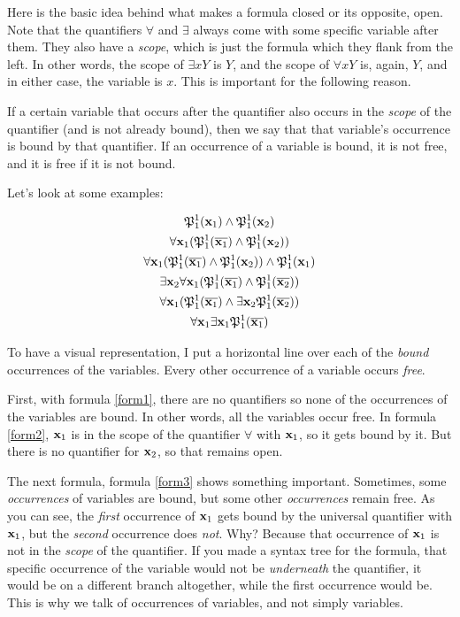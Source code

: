 Here is the basic idea behind what makes a formula closed or its opposite, open. Note that the quantifiers $\forall$ and $\exists$ always come with some specific variable after them. They also have a \textit{scope}, which is just the formula which they flank from the left. In other words, the scope of $\exists x Y$ is $Y$, and the scope of $\forall x Y$ is, again, $Y$, and in either case, the variable is $x$. This is important for the following reason. 

If a certain variable that occurs after the quantifier also occurs in the \textit{scope} of the quantifier (and is not already bound), then we say that that variable's occurrence is bound by that  quantifier. If an occurrence of a variable is bound, it is not free, and it is free if it is not bound. 

Let's look at some examples:

\begin{gather}
	\mathfrak{P}^{1}_{1}(\mathbf{x}_{1}) \wedge \mathfrak{P}^{1}_{1}(\mathbf{x}_{2})\label{form1}\\
	\forall \mathbf{x}_{1} (\mathfrak{P}^{1}_{1}(\overline{\mathbf{x}_{1}}) \wedge \mathfrak{P}^{1}_{1}(\mathbf{x}_{2}))\label{form2}\\
	\forall \mathbf{x}_{1} (\mathfrak{P}^{1}_{1}(\overline{\mathbf{x}_{1}}) \wedge \mathfrak{P}^{1}_{1}(\mathbf{x}_{2})) \wedge \mathfrak{P}^{1}_{1}(\mathbf{x}_{1})\label{form3}\\
	\exists \mathbf{x}_{2} \forall \mathbf{x}_{1}(\mathfrak{P}^{1}_{1}(\overline{\mathbf{x}_{1}}) \wedge \mathfrak{P}^{1}_{1}(\overline{\mathbf{x}_{2}}))\label{form4}\\
	\forall \mathbf{x}_{1}(\mathfrak{P}^{1}_{1}(\overline{\mathbf{x}_{1}}) \wedge \exists \mathbf{x}_{2} \mathfrak{P}^{1}_{1}(\overline{\mathbf{x}_{2}}))\label{form5}\\
	\forall \mathbf{x}_{1} \exists \mathbf{x}_{1} \mathfrak{P}^{1}_{1}(\overline{\mathbf{x}_{1}}) \label{form6}
	\end{gather}

To have a visual representation, I put a horizontal line over each of the \textit{bound} occurrences of the variables. Every other occurrence of a variable occurs \textit{free}.

First, with formula \ref{form1}, there are no quantifiers so none of the occurrences of the variables are bound. In other words, all the variables occur free. In formula \ref{form2}, $\mathbf{x}_{1}$ is in the scope of the quantifier $\forall$ with $\mathbf{x}_{1}$, so it gets bound by it. But there is no quantifier for $\mathbf{x}_{2}$, so that remains open. 

The next formula, formula \ref{form3} shows something important. Sometimes, some \textit{occurrences} of variables are bound, but some other \textit{occurrences} remain free. As you can see, the \textit{first} occurrence of $\mathbf{x}_{1}$ gets bound by the universal quantifier with $\mathbf{x}_{1}$, but the \textit{second} occurrence does \textit{not}. Why? Because that occurrence of $\mathbf{x}_{1}$ is not in the \textit{scope} of the quantifier. If you made a syntax tree for the formula, that specific occurrence of the variable would not be \textit{underneath} the quantifier, it would be on a different branch altogether, while the first occurrence would be. This is why we talk of occurrences of variables, and not simply variables. 

